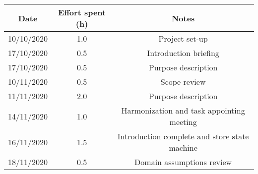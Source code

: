 \documentclass[../../main.tex]{subfiles}
\begin{document}
    \begin{center}
        \begin{tabular}{|c| |c| |c|} 
            \hline
            Date & Effort spent (h) & Notes\\ [0.5ex] 
            \hline\hline
            10/10/2020 & 1.0 & Project set-up\\ 
            17/10/2020 & 0.5 & Introduction briefing\\ 
            17/10/2020 & 0.5 & Purpose description\\ 
            10/11/2020 & 0.5 & Scope review\\
            11/11/2020 & 2.0 & Purpose description\\
            14/11/2020 & 1.0 & Harmonization and task appointing meeting\\
            16/11/2020 & 1.5 & Introduction complete and store state machine\\
            18/11/2020 & 0.5 & Domain assumptions review\\
            \hline
        \end{tabular}
    \end{center}
\end{document}

